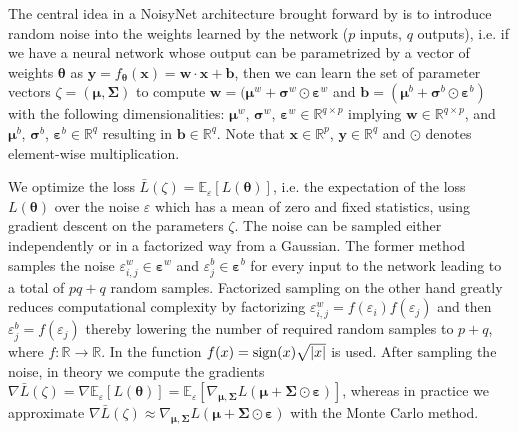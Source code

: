 \documentclass[10pt]{article} %
\begin{document}
\noindent The central idea in a NoisyNet architecture brought forward by \cite{noisynet-paper} is to introduce random noise into the weights learned by the network ($p$ inputs, $q$ outputs), i.e. if we have a neural network whose output can be parametrized by a vector of weights $\boldsymbol{\theta}$ as $\textbf{y} = f_{\boldsymbol{\theta}}(\textbf{x}) = \textbf{w} \cdot \textbf{x} + \textbf{b}$, then we can learn the set of parameter vectors $\zeta = (\boldsymbol{\mu}, \boldsymbol{\Sigma})$ to compute $\textbf{w} = (\boldsymbol{\mu}^{w} + \boldsymbol{\sigma}^{w} \odot \boldsymbol{\varepsilon}^{w}$ and $\textbf{b} = (\boldsymbol{\mu}^{b} + \boldsymbol{\sigma}^{b} \odot \boldsymbol{\varepsilon}^{b})$ with the following dimensionalities: $\boldsymbol{\mu}^{w}$, $\boldsymbol{\sigma}^{w}$, $\boldsymbol{\varepsilon}^{w} \in \mathbb{R}^{q \times p}$ implying $\textbf{w} \in \mathbb{R}^{q \times p}$, and $\boldsymbol{\mu}^{b}$, $\boldsymbol{\sigma}^{b}$, $\boldsymbol{\varepsilon}^{b} \in \mathbb{R}^{q}$ resulting in $\textbf{b} \in \mathbb{R}^{q}$. Note that $\textbf{x} \in \mathbb{R}^{p}$, $\textbf{y} \in \mathbb{R}^{q}$ and $\odot$ denotes element-wise multiplication.

\noindent We optimize the loss $\bar{L}(\zeta) = \mathbb{E}_{\varepsilon}[L(\boldsymbol{\theta})]$, i.e. the expectation of the loss $L(\boldsymbol{\theta})$ over the noise $\varepsilon$ which has a mean of zero and fixed statistics, using gradient descent on the parameters $\zeta$. The noise can be sampled either independently or in a factorized way from a Gaussian. The former method samples the noise $\varepsilon^{w}_{i,j} \in \boldsymbol{\varepsilon}^{w}$ and $\varepsilon^{b}_{j} \in \boldsymbol{\varepsilon}^{b}$ for every input to the network leading to a total of $pq + q$ random samples. Factorized sampling on the other hand greatly reduces computational complexity by factorizing $\varepsilon^{w}_{i,j} = f(\varepsilon_{i}) f(\varepsilon_{j})$ and then $\varepsilon^{b}_{j} = f(\varepsilon_{j})$ thereby lowering the number of required random samples to $p + q$, where $f: \mathbb{R} \rightarrow \mathbb{R}$. In \cite{noisynet-paper} the function $f(x) = \operatorname{sign}(x) \sqrt{|x|}$ is used. After sampling the noise, in theory we compute the gradients $\nabla\bar{L}(\zeta) = \nabla\mathbb{E}_{\varepsilon}[L(\boldsymbol{\theta})] = \mathbb{E}_{\varepsilon}[\nabla_{\boldsymbol{\mu}, \boldsymbol{\Sigma}}L(\boldsymbol{\mu} + \boldsymbol{\Sigma} \odot \boldsymbol{\varepsilon})]$, whereas in practice we approximate $\nabla\bar{L}(\zeta) \approx \nabla_{\boldsymbol{\mu}, \boldsymbol{\Sigma}}L(\boldsymbol{\mu} + \boldsymbol{\Sigma} \odot \boldsymbol{\varepsilon})$ with the Monte Carlo method.
\end{document}
